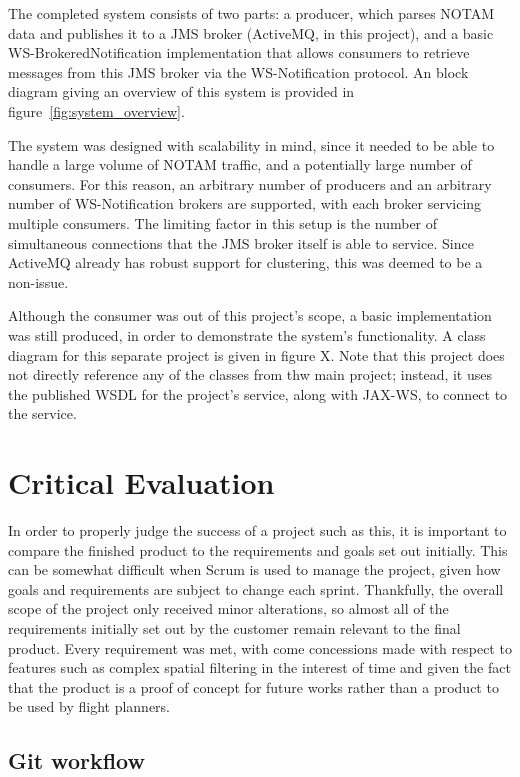 \documentclass[a4paper, 12pt, twoside]{article}
\begin{document}
The completed system consists of two parts: a producer, which parses NOTAM data and publishes it to a JMS broker (ActiveMQ, in this project), and a basic WS-BrokeredNotification implementation that allows consumers to retrieve messages from this JMS broker via the WS-Notification protocol. An block diagram giving an overview of this system is provided in figure~\ref{fig:system_overview}.

The system was designed with scalability in mind, since it needed to be able to handle a large volume of NOTAM traffic, and a potentially large number of consumers. For this reason, an arbitrary number of producers and an arbitrary number of WS-Notification brokers are supported, with each broker servicing multiple consumers. The limiting factor in this setup is the number of simultaneous connections that the JMS broker itself is able to service. Since ActiveMQ already has robust support for clustering, this was deemed to be a non-issue.

Although the consumer was out of this project's scope, a basic implementation was still produced, in order to demonstrate the system's functionality. A class diagram for this separate project is given in figure X. Note that this project does not directly reference any of the classes from thw main project; instead, it uses the published WSDL for the project's service, along with JAX-WS, to connect to the service.

\section{Critical Evaluation}
\label{sec:critical_evaluation}

In order to properly judge the success of a project such as this, it is important to compare the finished product to the requirements and goals set out initially. This can be somewhat difficult when Scrum is used to manage the project, given how goals and requirements are subject to change each sprint. Thankfully, the overall scope of the project only received minor alterations, so almost all of the requirements initially set out by the customer remain relevant to the final product. Every requirement was met, with come concessions made with respect to features such as complex spatial filtering in the interest of time and given the fact that the product is a proof of concept for future works rather than a product to be used by flight planners.

\subsection{Git workflow}
\label{sec:eval_git_workflow}
\end{document}
